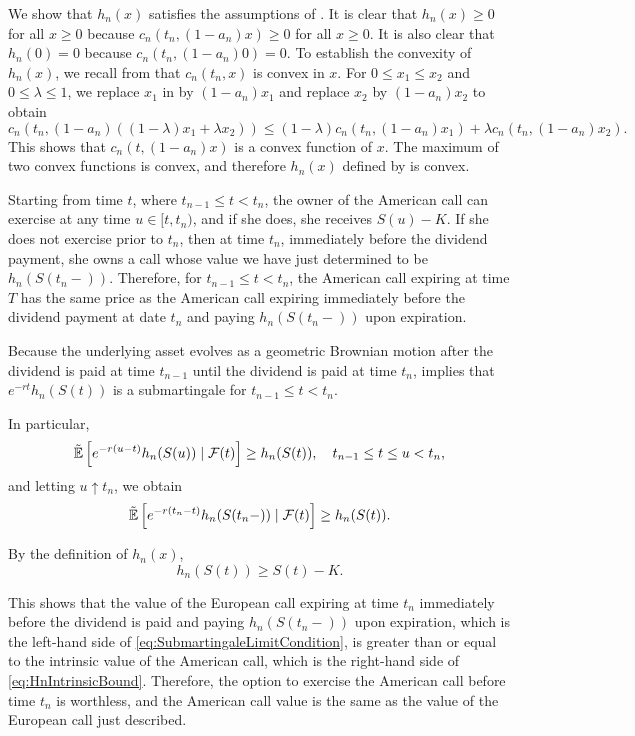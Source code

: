 We show that $h_n(x)$ satisfies the assumptions of . It is clear that $h_n(x) \ge 0$ for all $x \ge 0$ because $c_n(t_n, (1 - a_n)x) \ge 0$ for all $x \ge 0$. It is also clear that $h_n(0) = 0$ because $c_n(t_n, (1 - a_n)0) = 0$. To establish the convexity of $h_n(x)$, we recall from  that $c_n(t_n, x)$ is convex in $x$. For $0 \le x_1 \le x_2$ and $0 \le \lambda \le 1$, we replace $x_1$ in  by $(1 - a_n)x_1$ and replace $x_2$ by $(1 - a_n)x_2$ to obtain
\[
	c_n(t_n, (1 - a_n)((1 - \lambda)x_1 + \lambda x_2)) \le (1 - \lambda)c_n(t_n, (1 - a_n)x_1) + \lambda c_n(t_n, (1 - a_n)x_2).
\]
This shows that $c_n(t, (1 - a_n)x)$ is a convex function of $x$. The maximum of two convex functions is convex, and therefore $h_n(x)$ defined by  is convex.

Starting from time $t$, where $t_{n-1} \le t < t_n$, the owner of the American call can exercise at any time $u \in [t, t_n)$, and if she does, she receives $S(u) - K$. If she does not exercise prior to $t_n$, then at time $t_n$, immediately before the dividend payment, she owns a call whose value we have just determined to be $h_n(S(t_n-))$. Therefore, for $t_{n-1} \le t < t_n$, the American call expiring at time $T$ has the same price as the American call expiring immediately before the dividend payment at date $t_n$ and paying $h_n(S(t_n-))$ upon expiration.

Because the underlying asset evolves as a geometric Brownian motion after the dividend is paid at time $t_{n-1}$ until the dividend is paid at time $t_n$,  implies that \(e^{-rt} h_n (S(t))\) is a submartingale for $t_{n-1} \leq t < t_n$.

In particular,
\[
	\tilde{\mathbb{E}} \left[ e^{-r(u-t)}h_n(S(u)) \mid \mathcal{F}(t) \right] \geq h_n(S(t)), \quad t_{n-1} \leq t \leq u < t_n,
\]
and letting $u \uparrow t_n$, we obtain
\begin{equation}
	\tilde{\mathbb{E}} \left[ e^{-r(t_n-t)}h_n(S(t_n-)) \mid \mathcal{F}(t) \right] \geq h_n(S(t)). \label{eq:SubmartingaleLimitCondition}
\end{equation}

By the definition of $h_n(x)$,
\begin{equation}
	h_n(S(t)) \geq S(t) - K. \label{eq:HnIntrinsicBound}
\end{equation}

This shows that the value of the European call expiring at time $t_n$ immediately before the dividend is paid and paying $h_n(S(t_n-))$ upon expiration, which is the left-hand side of \eqref{eq:SubmartingaleLimitCondition}, is greater than or equal to the intrinsic value of the American call, which is the right-hand side of \eqref{eq:HnIntrinsicBound}. Therefore, the option to exercise the American call before time $t_n$ is worthless, and the American call value is the same as the value of the European call just described.

